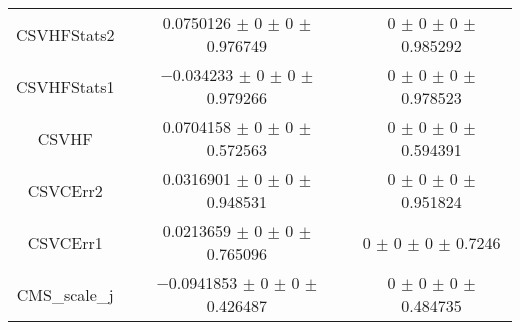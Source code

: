 \begin{table}
\begin{tabular}{ccc}
CSVHFStats2 	& \num{0.0750126} $\pm$ \num{0} $\pm$ \num{0} $\pm$ \num{0.976749} 	& \num{0} $\pm$ \num{0} $\pm$ \num{0} $\pm$ \num{0.985292}\\
CSVHFStats1 	& \num{-0.034233} $\pm$ \num{0} $\pm$ \num{0} $\pm$ \num{0.979266} 	& \num{0} $\pm$ \num{0} $\pm$ \num{0} $\pm$ \num{0.978523}\\
CSVHF 	& \num{0.0704158} $\pm$ \num{0} $\pm$ \num{0} $\pm$ \num{0.572563} 	& \num{0} $\pm$ \num{0} $\pm$ \num{0} $\pm$ \num{0.594391}\\
CSVCErr2 	& \num{0.0316901} $\pm$ \num{0} $\pm$ \num{0} $\pm$ \num{0.948531} 	& \num{0} $\pm$ \num{0} $\pm$ \num{0} $\pm$ \num{0.951824}\\
CSVCErr1 	& \num{0.0213659} $\pm$ \num{0} $\pm$ \num{0} $\pm$ \num{0.765096} 	& \num{0} $\pm$ \num{0} $\pm$ \num{0} $\pm$ \num{0.7246}\\
CMS\_scale\_j 	& \num{-0.0941853} $\pm$ \num{0} $\pm$ \num{0} $\pm$ \num{0.426487} 	& \num{0} $\pm$ \num{0} $\pm$ \num{0} $\pm$ \num{0.484735}\\
\bottomrule
\end{tabular}
\end{table}